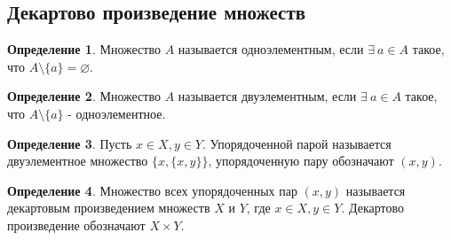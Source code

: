 \documentclass[a4paper, 12pt]{article}
\renewcommand{\emptyset}{\varnothing}
\theoremstyle{definition}
\newtheorem*{definition}{Определение}
\begin{document}
    \subsection{Декартово произведение множеств}
        \begin{definition}
            Множество $A$ называется одноэлементным, если $\exists\ a\in A$ такое, что $A\setminus\{a\} = \emptyset$.
        \end{definition}
        \begin{definition}
            Множество $A$ называется двуэлементным, если $\exists\ a\in A$ такое, что $A\setminus\{a\}$ - одноэлементное.
        \end{definition}
        \begin{definition}
            Пусть $x\in X, y\in Y$. Упорядоченной парой называется двуэлементное множество $\{x,\{x,y\}\}$, упорядоченную пару обозначают $(x,y)$.
        \end{definition}
        \begin{definition}
            Множество всех упорядоченных пар $(x,y)$ называется декартовым произведением множеств $X$ и $Y$, где $x\in X, y\in Y$. Декартово произведение обозначают $X\times Y$.
        \end{definition}
\end{document}
